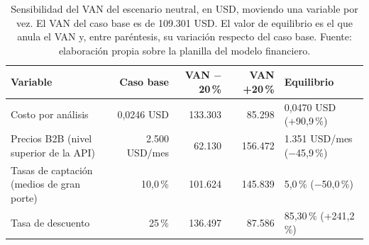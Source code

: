 \begin{table}[t]
  \centering
  \footnotesize
  \caption{Sensibilidad del VAN del escenario neutral, en USD, moviendo una variable por vez. El VAN del caso base es de 109.301 USD. El valor de equilibrio es el que anula el VAN y, entre paréntesis, su variación respecto del caso base. Fuente: elaboración propia sobre la planilla del modelo financiero.}
  \label{tab:financiero-sensibilidad}
  \begin{tabular}{p{3.6cm} r r r p{3.4cm}}
    \hline
    \textbf{Variable} & \textbf{Caso base} & \textbf{VAN $-$20\,\%} & \textbf{VAN +20\,\%} & \textbf{Equilibrio} \\
    \hline
    Costo por análisis & 0,0246 USD & 133.303 & 85.298 & 0,0470 USD (+90,9\,\%) \\
    Precios B2B (nivel superior de la API) & 2.500 USD/mes & 62.130 & 156.472 & 1.351 USD/mes ($-$45,9\,\%) \\
    Tasas de captación (medios de gran porte) & 10,0\,\% & 101.624 & 145.839 & 5,0\,\% ($-$50,0\,\%) \\
    Tasa de descuento & 25\,\% & 136.497 & 87.586 & 85,30\,\% (+241,2\,\%) \\
    \hline
  \end{tabular}
\end{table}
